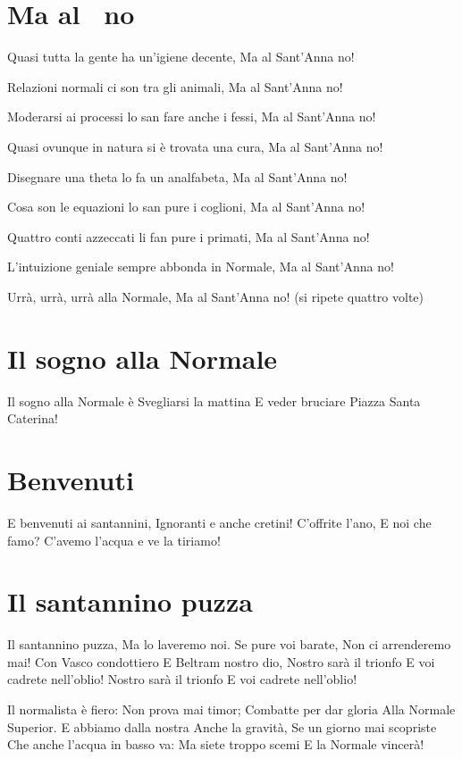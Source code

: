 \section{Ma al \santanna\ no}
\subtitle{Sulla melodia di “Ma la notte no”}
\begin{canzone}
Quasi tutta la gente ha un’igiene decente,
Ma al Sant'Anna no!

Relazioni normali ci son tra gli animali,
Ma al Sant'Anna no!

Moderarsi ai processi lo san fare anche i fessi,
Ma al Sant'Anna no!

Quasi ovunque in natura si è trovata una cura,
Ma al Sant'Anna no!

Disegnare una theta lo fa un analfabeta,
Ma al Sant'Anna no!

Cosa son le equazioni lo san pure i coglioni,
Ma al Sant'Anna no!

Quattro conti azzeccati li fan pure i primati,
Ma al Sant'Anna no!

L’intuizione geniale sempre abbonda in Normale,
Ma al Sant'Anna no!

Urrà, urrà, urrà alla Normale,
Ma al Sant'Anna no! 
(si ripete quattro volte)
\end{canzone}

\section{Il sogno alla Normale}
\begin{canzone}
Il sogno alla Normale è 
Svegliarsi la mattina
E veder bruciare 
Piazza Santa Caterina! 
\end{canzone}

\section{Benvenuti}
\subtitle{Sulla melodia di “La società dei Magnaccioni” di Lando Fiorini}
\begin{canzone}
E benvenuti ai santannini,
Ignoranti e anche cretini!
C’offrite l’ano,
E noi che famo?
C’avemo l’acqua e ve la tiriamo!
\end{canzone}

\section{Il santannino puzza}
\subtitle{Sulla melodia della “Virginia Company”}
\begin{canzone}
Il santannino puzza,
Ma lo laveremo noi.
Se pure voi barate,
Non ci arrenderemo mai!
Con Vasco condottiero
E Beltram nostro dio,
Nostro sarà il trionfo
E voi cadrete nell’oblio!
Nostro sarà il trionfo
E voi cadrete nell’oblio!

Il normalista è fiero:
Non prova mai timor;
Combatte per dar gloria
Alla Normale Superior.
E abbiamo dalla nostra
Anche la gravità,
Se un giorno mai scopriste
Che anche l’acqua in basso va:
Ma siete troppo scemi
E la Normale vincerà!
\end{canzone}

